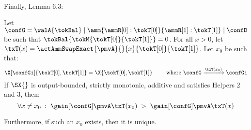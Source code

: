 Finally, Lemma 6.3:

\begin{thm}[Arbitrage]
  \label{thm:arbitrage}  
  Let $\confG = \walA{\tokBal} \mid \amm{\ammR[0]:\tokT[0]}{\ammR[1]:\tokT[1]} \mid \confD$ 
  be such that $\tokBal{\tokM{\tokT[0]}{\tokT[1]}} = 0$.
  For all $x > 0$, 
  let $\txT(x) = \actAmmSwapExact{\pmvA}{}{x}{\tokT[0]}{\tokT[1]}$.
  Let $x_0$ be such that:
  \begin{equation}
    \label{eq:arbitrage:max:x0}
    \X[\confGi]{\tokT[0],\tokT[1]} = \X{\tokT[0],\tokT[1]}
    \qquad
    \text{ where }
    \confG \xrightarrow{\txT(x_0)} \confGi
  \end{equation}
  If $\SX{}$ is output-bounded, strictly monotonic, additive and satisfies Helpers 2 and 3, then:
  \[
    \forall x \neq x_0
    \; : \;
    \gain[{\confG}]{\pmvA}{\txT(x_0)}
    \; > \;
    \gain[{\confG}]{\pmvA}{\txT(x)}
  \]

  Furthermore, if such an $x_0$ exists, then it is unique. 
\end{thm}

